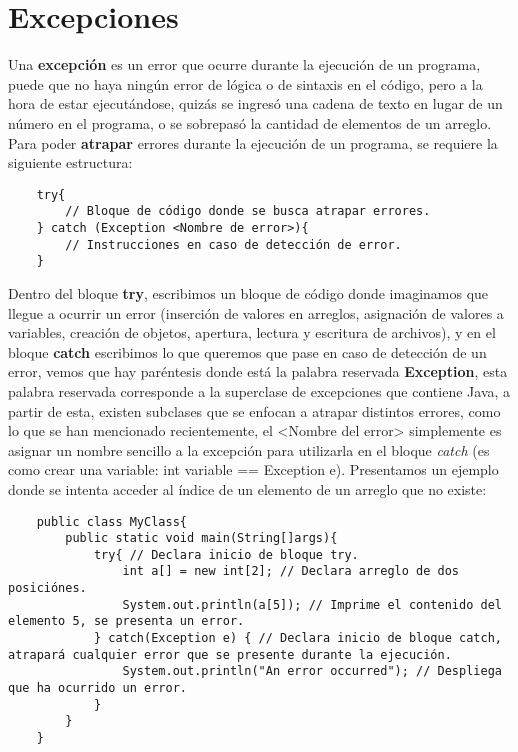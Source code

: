\section{Excepciones}

Una \textbf{excepción} es un error que ocurre durante la ejecución de un programa, puede que no haya ningún error de lógica o de sintaxis en el código, pero a la hora de estar ejecutándose, quizás se ingresó una cadena de texto en lugar de un número en el programa, o se sobrepasó la cantidad de elementos de un arreglo. Para poder \textbf{atrapar} errores durante la ejecución de un programa, se requiere la siguiente estructura:
\begin{lstlisting}
    try{
        // Bloque de código donde se busca atrapar errores.
    } catch (Exception <Nombre de error>){
        // Instrucciones en caso de detección de error.
    }
\end{lstlisting}

Dentro del bloque \textbf{try}, escribimos un bloque de código donde imaginamos que llegue a ocurrir un error (inserción de valores en arreglos, asignación de valores a variables, creación de objetos, apertura, lectura y escritura de archivos), y en el bloque \textbf{catch} escribimos lo que queremos que pase en caso de detección de un error, vemos que hay paréntesis donde está la palabra reservada \textbf{Exception}, esta palabra reservada corresponde a la superclase de excepciones que contiene Java, a partir de esta, existen subclases que se enfocan a atrapar distintos errores, como lo que se han mencionado recientemente, el <Nombre del error> simplemente es asignar un nombre sencillo a la excepción para utilizarla en el bloque \textit{catch} (es como crear una variable: int variable == Exception e). Presentamos un ejemplo donde se intenta acceder al índice de un elemento de un arreglo que no existe:
\begin{lstlisting}
    public class MyClass{
        public static void main(String[]args){
            try{ // Declara inicio de bloque try.
                int a[] = new int[2]; // Declara arreglo de dos posiciónes.
                System.out.println(a[5]); // Imprime el contenido del elemento 5, se presenta un error.
            } catch(Exception e) { // Declara inicio de bloque catch, atrapará cualquier error que se presente durante la ejecución.
                System.out.println("An error occurred"); // Despliega que ha ocurrido un error.
            }
        }
    }
\end{lstlisting}


